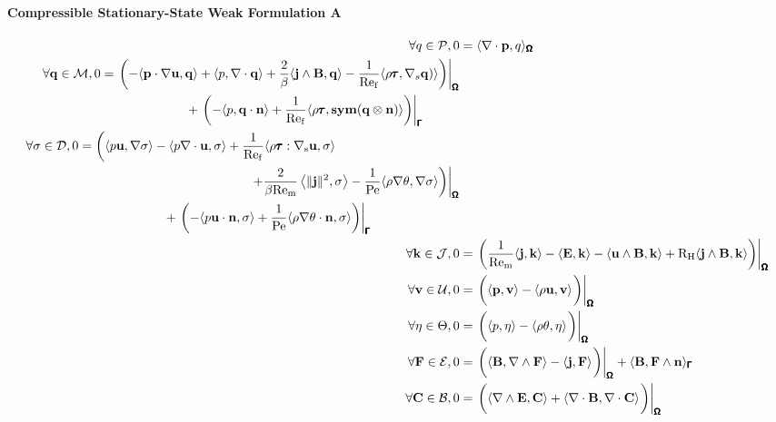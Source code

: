     \paragraph*{Compressible Stationary-State Weak Formulation A}
    \begin{align}
        \forall q \in \calP,  0  &=  \langle\nabla\cdot\bfp, q\rangle_{\bfOmega}  \\
        \begin{split}
            \forall \bfq \in \calM,  0  &=  \left.\left(- \langle\bfp\cdot\nabla\bfu, \bfq\rangle + \langle p, \nabla\cdot\bfq\rangle + \frac{2}{\beta}\langle\bfj\wedge\bfB, \bfq\rangle - \frac{1}{\rmRef}\langle\rho\bftau, \nabla_{s}\bfq)\rangle\right)\right|_{\bfOmega}  \\
            &\;\;\;\;\;\;\;\;\;\;\;\;\;\;\;\;\;\;\;\;\;\;\;\;  + \left.\left(- \langle p, \bfq\cdot\bfn\rangle + \frac{1}{\rmRef}\langle\rho\bftau, \sym(\bfq\otimes\bfn)\rangle\right)\right|_{\bfGamma}
        \end{split}  \\
        \begin{split}
            \forall \sigma \in \calD,  0  &=  \left(\langle p\bfu, \nabla\sigma\rangle - \langle p\nabla\cdot\bfu, \sigma\rangle + \frac{1}{\rmRef}\langle\rho\bftau:\nabla_{\rms}\bfu, \sigma\rangle\right.  \\
            &\;\;\;\;\;\;\;\;\;\;\;\;\;\;\;\;\;\;\;\;\;\;\;\;\;\;\;\;\;\;\;\;\;\;\;\;\;\;\;\;\;\;\;\;\;\;\;\;\left.\left.+ \frac{2}{\beta\rmRem}\left\langle\|\bfj\|^{2}, \sigma\right\rangle - \frac{1}{\rmPe}\langle\rho\nabla\theta, \nabla\sigma\rangle\right)\right|_{\bfOmega}  \\
            &\;\;\;\;\;\;\;\;\;\;\;\;\;\;\;\;\;\;\;\;\;\;\;\;  + \left.\left(- \langle p\bfu\cdot\bfn, \sigma\rangle + \frac{1}{\rmPe}\langle\rho\nabla\theta\cdot\bfn, \sigma\rangle\right)\right|_{\bfGamma}
        \end{split}  \\
        \forall \bfk \in \calJ,  0  &=  \left.\left(\frac{1}{\rmRem}\langle\bfj, \bfk\rangle - \langle\bfE, \bfk\rangle - \langle\bfu\wedge\bfB, \bfk\rangle + \rmRH\langle\bfj\wedge\bfB, \bfk\rangle\right)\right|_{\bfOmega}  \\
        \forall \bfv \in \calU,  0  &=  \left.\left(\langle\bfp, \bfv\rangle - \langle\rho\bfu, \bfv\rangle\tall\right)\right|_{\bfOmega}  \\
        \forall \eta \in \Theta,  0  &=  \left.\left(\langle p, \eta\rangle - \langle\rho\theta, \eta\rangle\tall\right)\right|_{\bfOmega}  \\
        \forall \bfF \in \calE,  0  &=  \left.\left(\langle\bfB, \nabla\wedge\bfF\rangle - \langle\bfj, \bfF\rangle\tall\right)\right|_{\bfOmega} + \langle\bfB, \bfF\wedge\bfn\rangle_{\bfGamma}  \\
        \forall \bfC \in \calB,  0  &=  \left.\left(\langle\nabla\wedge\bfE, \bfC\rangle + \langle\nabla\cdot\bfB, \nabla\cdot\bfC\rangle\tall\right)\right|_{\bfOmega}
    \end{align}
        
